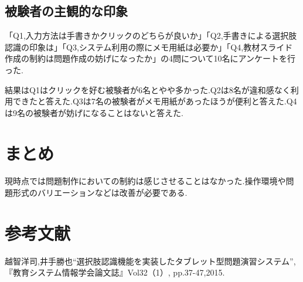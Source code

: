 \documentclass[a4j,11pt]{jsarticle}
\begin{document}
\subsection{被験者の主観的な印象}
「Q1,入力方法は手書きかクリックのどちらが良いか」「Q2,手書きによる選択肢認識の印象は」「Q3,システム利用の際にメモ用紙は必要か」「Q4,教材スライド作成の制約は問題作成の妨げになったか」の4問について10名にアンケートを行った.

結果はQ1はクリックを好む被験者が6名とやや多かった.Q2は8名が違和感なく利用できたと答えた.Q3は7名の被験者がメモ用紙があったほうが便利と答えた.Q4は9名の被験者が妨げになることはないと答えた.
\section{まとめ}
現時点では問題制作においての制約は感じさせることはなかった.操作環境や問題形式のバリエーションなどは改善が必要である.

\section{参考文献}
\label{sec:bunken}
越智洋司,井手勝也“選択肢認識機能を実装したタブレット型問題演習システム”,『教育システム情報学会論文誌』Vol32（1）, pp.37-47,2015.
  
\end{document}
